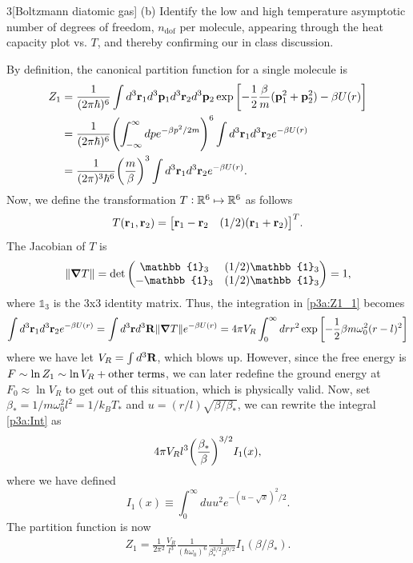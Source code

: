 \documentclass[12pt]{article}
\begin{document}
\begin{problem}{3}[Boltzmann diatomic gas]
(b) Identify the low and high temperature asymptotic number of degrees of
freedom, $n_\text{dof}$ per molecule, appearing through the heat capacity plot
vs. $T$, and thereby confirming our in class discussion.
\begin{solution}
By definition, the canonical partition function for a single molecule is
\begin{align}\label{p3a:Z1_1}
    Z_1
    &=\frac1{(2\pi\hbar)^6}\int d^3\vb{r}_1d^3\vb{p}_1 d^3\vb{r}_2d^3\vb{p}_2
    \exp\qty[-\frac12\frac{\beta}{m}(\vb{p}_1^2+\vb{p}_2^2)-\beta U(r)]\notag\\
    &=\frac1{(2\pi\hbar)^6}\qty(\int_{-\infty}^\infty dp e^{-\beta p^2/2m})^6
    \int d^3\vb{r}_1d^3\vb{r}_2e^{-\beta U(r)}\notag\\
    &=\frac1{(2\pi)^3\hbar^6}\qty(\frac{m}{\beta})^3
    \int d^3\vb{r}_1d^3\vb{r}_2e^{-\beta U(r)}.
\end{align}
Now, we define the transformation $T:\mathbb{R}^6\mapsto\mathbb{R}^6$ as follows
\begin{equation}
    T(\vb{r}_1,\vb{r}_2)
    =\mqty[\vb{r}_1-\vb{r}_2&(1/2)\qty(\vb{r}_1+\vb{r}_2)]^T .
\end{equation}
The Jacobian of $T$ is
\begin{equation}
    \norm{\grad{T}}
    =\det\mqty(\mathbb{1}_3&(1/2)\mathbb{1}_3\\-\mathbb{1}_3&(1/2)\mathbb{1}_3)
    =1,
\end{equation}
where $\mathbb{1}_3$ is the 3x3 identity matrix. Thus, the integration in
\eqref{p3a:Z1_1} becomes
\begin{align}\label{p3a:Int}
    \int d^3\vb{r}_1d^3\vb{r}_2e^{-\beta U(r)}
    =\int d^3\vb{r}d^3\vb{R}\norm{\grad{T}}e^{-\beta U(r)}
    =4\pi V_R\int_0^\infty dr r^2\exp\qty[-\frac12\beta m\omega_0^2(r-l)^2]
\end{align}
where we have let $V_R=\int d^3\vb{R}$, which blows up. However, since the free
energy is $F\sim\ln Z_1\sim\ln V_R+\text{other terms}$, we can later redefine the 
ground energy at $F_0\approx\ln V_R$ to get out of this situation, which is
physically valid. Now, set $\beta_\ast=1/m\omega_0^2l^2=1/k_BT_\ast$ and
$u=(r/l)\sqrt{\beta/\beta_\ast}$, we can rewrite the integral \eqref{p3a:Int} as
\begin{align*}
    4\pi V_Rl^3\qty(\frac{\beta_\ast}{\beta})^{3/2} I_1(x),
\end{align*}
where we have defined
\begin{equation}
    I_1(x)\equiv\int_0^\infty duu^2e^{-(u-\sqrt{x})^2/2}.
\end{equation}
The partition function is now
\begin{align}
    Z_1
    =\frac1{2\pi^2}\frac{V_R}{l^3}\frac1{(\hbar\omega_0)^6}\frac1{\beta_\ast^{3/2}\beta^{9/2}}I_1(\beta/\beta_\ast).
\end{align}


\end{solution}
\end{problem}
\end{document}
